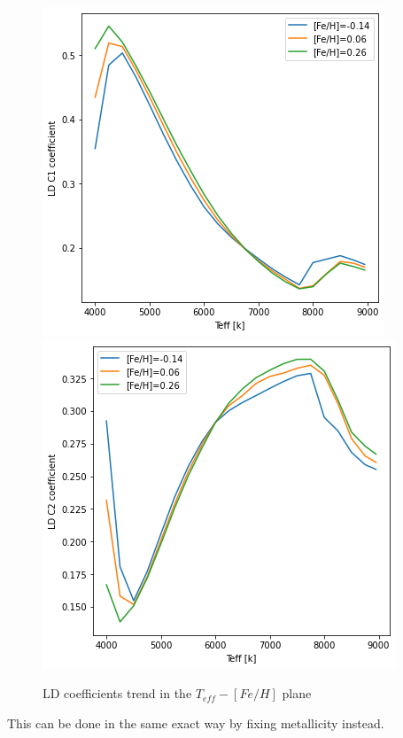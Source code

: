 \documentclass[a4paper,11pt,twocolumn]{article}
\begin{document}
\begin{figure}[H]
    \centering  
    \includegraphics[scale=0.35, angle=0]{../pictures/Claret2017/double_c1}
    \includegraphics[scale=0.35, angle=0]{../pictures/Claret2017/double_c2}
    \caption{LD coefficients trend in the $T_{eff}-[Fe/H]$ plane}
\end{figure}
This can be done in the same exact way by fixing metallicity instead.
\end{document}
